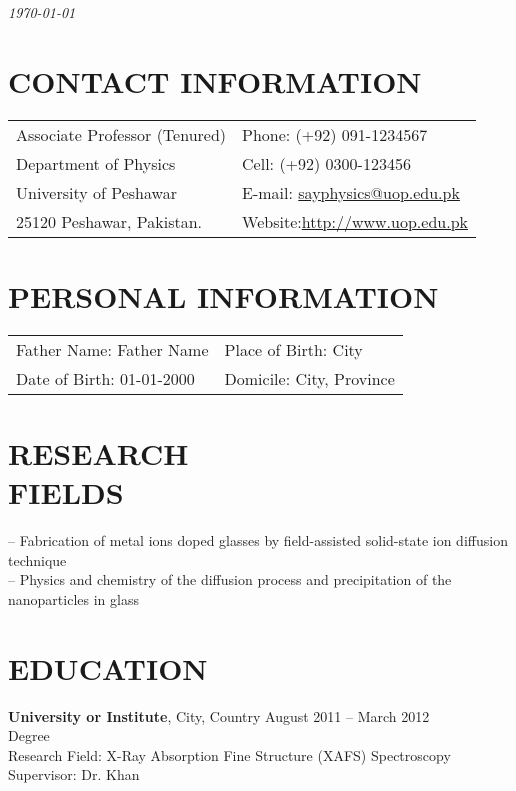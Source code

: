 \documentclass[margin,line]{res}
\begin{document}
 \hfill {\em \today}

\begin{resume}
\section{CONTACT INFORMATION}
\vspace{.05in}
\begin{tabular}{@{}p{3.5in}p{3in}}
Associate Professor (Tenured)             & {Phone:}  (+92) 091-1234567 \\
Department of Physics 
 & {Cell:}  (+92) 0300-123456 \\
University of Peshawar             & {E-mail:}  \url{sayphysics@uop.edu.pk}\\
25120 Peshawar, Pakistan.  & 
{Website:}\url{http://www.uop.edu.pk}
\end{tabular}

\section{PERSONAL INFORMATION}
\vspace{.05in}
\begin{tabular}{@{}p{2.7in}p{3in}}

Father Name:	Father Name             & {Place of Birth:}		City\\
Date of Birth:		01-01-2000        & {Domicile:}		City, Province\\
\end{tabular}

\section{RESEARCH \\FIELDS}
-- Fabrication of metal ions doped glasses by field-assisted solid-state ion diffusion technique\\
-- Physics and chemistry of the diffusion process and precipitation of the nanoparticles in glass\\

\section{EDUCATION}
{\bf University or Institute}, City, Country \hfill August 2011 -- March 2012\\
Degree\\ 
Research Field:	X-Ray Absorption Fine Structure (XAFS) Spectroscopy\\
Supervisor:		Dr. Khan\\


\end{resume}
\end{document}
